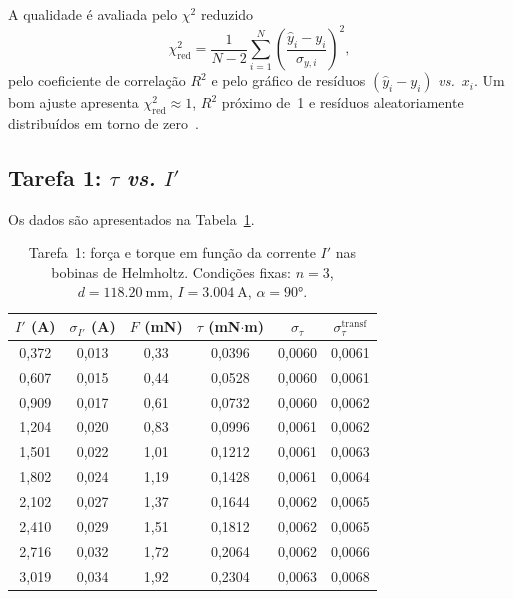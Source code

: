 \documentclass[aps, twocolumn, superscriptaddress, floatfix, nofootinbib]{revtex4-2}
\begin{document}
A qualidade é avaliada pelo $\chi^2$ reduzido
\begin{equation}\label{eq:chi2}
  \chi^2_{\text{red}}
    = \frac{1}{N-2}\sum_{i=1}^{N}
      \left(\frac{\hat{y}_i - y_i}{\sigma_{y,i}}\right)^2,
\end{equation}
pelo coeficiente de correlação $R^2$ e pelo gráfico de resíduos
$(\hat{y}_i - y_i)$ \emph{vs.}~$x_i$. Um bom ajuste apresenta
$\chi^2_{\text{red}}\approx 1$, $R^2$ próximo de~1 e resíduos aleatoriamente
distribuídos em torno de zero~\cite{Vuolo}.


\subsection{Tarefa 1: $\tau$ \emph{vs.} $I'$}

Os dados são apresentados na Tabela~\ref{tab:t1}.

\begin{table}[H]
\caption{Tarefa~1: força e torque em função da corrente $I'$ nas bobinas de
Helmholtz. Condições fixas: $n=3$, $d=\SI{118,20}{\milli\metre}$,
$I=\SI{3,004}{\ampere}$, $\alpha=\ang{90}$.}\label{tab:t1}
\begin{ruledtabular}
\begin{tabular}{cccccc}
$I'$ (A) & $\sigma_{I'}$ (A) & $F$ (mN) & $\tau$ (mN$\cdot$m) & $\sigma_\tau$ & $\sigma_\tau^{\text{transf}}$ \\
\hline
0,372 & 0,013 & 0,33 & 0,0396 & 0,0060 & 0,0061 \\
0,607 & 0,015 & 0,44 & 0,0528 & 0,0060 & 0,0061 \\
0,909 & 0,017 & 0,61 & 0,0732 & 0,0060 & 0,0062 \\
1,204 & 0,020 & 0,83 & 0,0996 & 0,0061 & 0,0062 \\
1,501 & 0,022 & 1,01 & 0,1212 & 0,0061 & 0,0063 \\
1,802 & 0,024 & 1,19 & 0,1428 & 0,0061 & 0,0064 \\
2,102 & 0,027 & 1,37 & 0,1644 & 0,0062 & 0,0065 \\
2,410 & 0,029 & 1,51 & 0,1812 & 0,0062 & 0,0065 \\
2,716 & 0,032 & 1,72 & 0,2064 & 0,0062 & 0,0066 \\
3,019 & 0,034 & 1,92 & 0,2304 & 0,0063 & 0,0068 \\
\end{tabular}
\end{ruledtabular}
\end{table}
\end{document}
